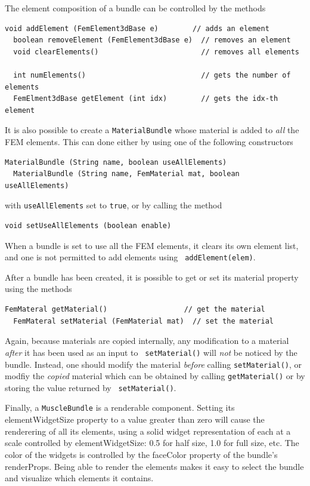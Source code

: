 The element composition of a bundle can be controlled by the methods
%
\begin{lstlisting}[]
  void addElement (FemElement3dBase e)        // adds an element
  boolean removeElement (FemElement3dBase e)  // removes an element
  void clearElements()                        // removes all elements

  int numElements()                           // gets the number of elements
  FemElment3dBase getElement (int idx)        // gets the idx-th element 
\end{lstlisting}
%

It is also possible to create a {\tt MaterialBundle} whose material is
added to {\it all} the FEM elements. This can done either by using one
of the following constructors
%
\begin{lstlisting}[]
  MaterialBundle (String name, boolean useAllElements)
  MaterialBundle (String name, FemMaterial mat, boolean useAllElements)
\end{lstlisting}
%
with {\tt useAllElements} set to {\tt true}, or
by calling the method
%
\begin{lstlisting}[]
  void setUseAllElements (boolean enable)
\end{lstlisting}
%
When a bundle is set to use all the FEM elements, it clears its own
element list, and one is not permitted to add elements using {\tt
addElement(elem)}.

After a bundle has been created, it is possible to get or set
its {\sf material} property using the methods
%
\begin{lstlisting}[]
  FemMateral getMaterial()                  // get the material
  FemMateral setMaterial (FemMaterial mat)  // set the material
\end{lstlisting}
%
Again, because materials are copied internally, any modification to a
material {\it after} it has been used as an input to {\tt
setMaterial()} will {\it not} be noticed by the bundle. Instead, one
should modify the material {\it before} calling {\tt setMaterial()},
or modfiy the {\it copied} material which can be obtained by calling
{\tt getMaterial()} or by storing the value returned by {\tt
setMaterial()}.

Finally, a {\tt MuscleBundle} is a renderable component. Setting its
{\sf elementWidgetSize} property to a value greater than zero will
cause the renderering of all its elements, using a solid widget
representation of each at a scale controlled by {\sf elementWidgetSize}:
0.5 for half size, 1.0 for full size, etc. The color of the
widgets is controlled by the {\sf faceColor} property of the bundle's
{\sf renderProps}. Being able to render the elements makes it easy to
select the bundle and visualize which elements it contains.

